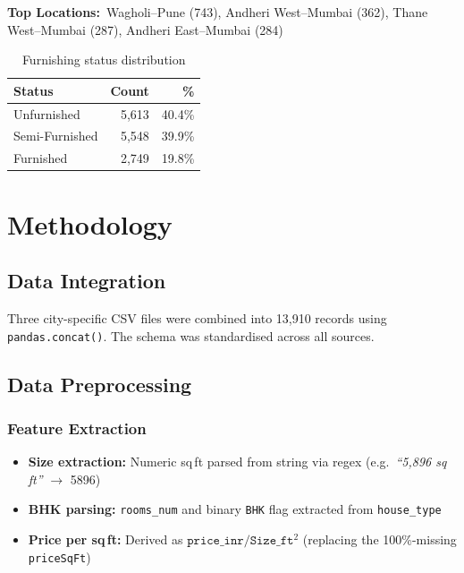 \documentclass[12pt,a4paper]{article}
\newcommand{\TH}[1]{\cellcolor{TblHead}\color{white}\sffamily\bfseries\small #1}
\newcommand{\RA}{\cellcolor{RowA}}
\newcommand{\RB}{\cellcolor{RowB}}
\begin{document}
\noindent\textbf{Top Locations:}\ Wagholi--Pune (743), Andheri West--Mumbai (362),
Thane West--Mumbai (287), Andheri East--Mumbai (284)

\begin{table}[H]\centering
  \caption{Furnishing status distribution}
  \begin{tabular}{lrr}
    \toprule
    \TH{Status} & \TH{Count} & \TH{\%} \\
    \midrule
    \RA Unfurnished    & 5{,}613 & 40.4\% \\
    \RB Semi-Furnished & 5{,}548 & 39.9\% \\
    \RA Furnished      & 2{,}749 & 19.8\% \\
    \bottomrule
  \end{tabular}
\end{table}

\section{Methodology}

\subsection{Data Integration}
Three city-specific CSV files were combined into 13{,}910 records using
\texttt{pandas.concat()}. The schema was standardised across all sources.

\subsection{Data Preprocessing}

\subsubsection{Feature Extraction}
\begin{itemize}
  \item \textbf{Size extraction:} Numeric sq\,ft parsed from string via regex
        (e.g.\ \textit{``5{,}896 sq ft''} $\to$ 5896)
  \item \textbf{BHK parsing:} \texttt{rooms\_num} and binary \texttt{BHK} flag extracted
        from \texttt{house\_type}
  \item \textbf{Price per sq\,ft:} Derived as
        $\texttt{price\_inr} / \texttt{Size\_ft}^{2}$
        (replacing the 100\%-missing \texttt{priceSqFt})
\end{itemize}
\end{document}
